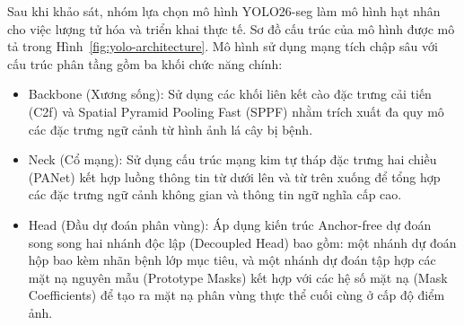 Sau khi khảo sát, nhóm lựa chọn mô hình YOLO26-seg làm mô hình hạt nhân cho việc lượng tử hóa và triển khai thực tế. Sơ đồ cấu trúc của mô hình được mô tả trong Hình~\ref{fig:yolo-architecture}. Mô hình sử dụng mạng tích chập sâu với cấu trúc phân tầng gồm ba khối chức năng chính:
\begin{itemize}
  \item Backbone (Xương sống): Sử dụng các khối liên kết cào đặc trưng cải tiến (C2f) và Spatial Pyramid Pooling Fast (SPPF) nhằm trích xuất đa quy mô các đặc trưng ngữ cảnh từ hình ảnh lá cây bị bệnh.
  \item Neck (Cổ mạng): Sử dụng cấu trúc mạng kim tự tháp đặc trưng hai chiều (PANet) kết hợp luồng thông tin từ dưới lên và từ trên xuống để tổng hợp các đặc trưng ngữ cảnh không gian và thông tin ngữ nghĩa cấp cao.
  \item Head (Đầu dự đoán phân vùng): Áp dụng kiến trúc Anchor-free dự đoán song song hai nhánh độc lập (Decoupled Head) bao gồm: một nhánh dự đoán hộp bao kèm nhãn bệnh lớp mục tiêu, và một nhánh dự đoán tập hợp các mặt nạ nguyên mẫu (Prototype Masks) kết hợp với các hệ số mặt nạ (Mask Coefficients) để tạo ra mặt nạ phân vùng thực thể cuối cùng ở cấp độ điểm ảnh.
\end{itemize}

